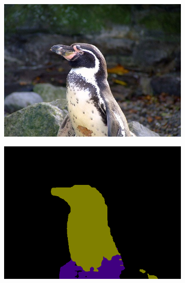 \documentclass{article} %
\begin{document}
\begin{figure}[t]
\begin{subfigure}[b]{0.19\linewidth}
  \end{subfigure}

  \begin{subfigure}[b]{0.19\linewidth}
    \includegraphics[width=\textwidth]{figs/ab/img/2007_008051}
  \end{subfigure}
  \begin{subfigure}[b]{0.19\linewidth}
    \includegraphics[width=\textwidth]{figs/ab/step8/2007_008051}
  \end{subfigure}
  \begin{subfigure}[b]{0.19\linewidth}

\end{subfigure}
\end{figure}
\end{document}
